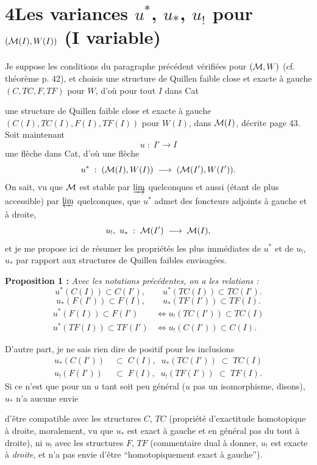\section*{4\quad Les variances $u^*$, $u_*$, $u_{!}$ pour $(\mathcal{M}(I),W(I))$ (I variable)}

Je suppose les conditions du paragraphe précédent vérifiées pour $(\mathcal{M},W)$ (cf. théorème p. 42), et choisis une structure de Quillen faible close et exacte à gauche $(C,TC,F,TF)$ pour $W$, d'où pour tout $I$ dans Cat

\noindent{}

\noindent une structure de Quillen faible close et exacte à gauche $(C(I),TC(I),F(I),TF(I))$ pour $W(I)$, dans $\mathcal{M}(I)$, décrite page 43. Soit maintenant
\[
u \;:\; I' \longrightarrow I
\]
une flèche dans Cat, d'où une flèche
\[
u^* \;:\; (\mathcal{M}(I),W(I)) \;\longrightarrow\; (\mathcal{M}(I'),W(I')).
\]
On sait, vu que $\mathcal{M}$ est stable par $\mathop{\underrightarrow{\mathrm{lim}}}$ quelconques et aussi (étant de plus accessible) par $\mathop{\underleftarrow{\mathrm{lim}}}$ quelconques, que $u^*$ admet des foncteurs adjoints à gauche et à droite,
\[
u_{!},\ u_* \;:\; \mathcal{M}(I') \;\longrightarrow\; \mathcal{M}(I),
\]
et je me propose ici de résumer les propriétés les plus immédiates de $u^*$ et de $u_{!}$, $u_*$ par rapport aux structures de Quillen faibles envisagées.

\textbf{Proposition 1 :} \textit{Avec les notations précédentes, on a les relations :}
\[
u^*(C(I)) \subset C(I'), \qquad u^*(TC(I)) \subset TC(I'). \tag*{(1)}
\]
\[
u_*(F(I')) \subset F(I), \qquad u_*(TF(I')) \subset TF(I). \tag*{(2)}
\]
\[
\begin{aligned}
u^*(F(I)) \subset F(I') &\iff u_{!}(TC(I')) \subset TC(I)\\
u^*(TF(I)) \subset TF(I') &\iff u_{!}(C(I')) \subset C(I).
\end{aligned} \tag*{(3)}
\]

D'autre part, je ne sais rien dire de positif pour les inclusions
\[
\begin{aligned}
u_*(C(I')) \;&\subset\; C(I), \;\; u_*(TC(I')) \;\subset\; TC(I)\\
u_{!}(F(I')) \;&\subset\; F(I), \;\; u_{!}(TF(I')) \;\subset\; TF(I).
\end{aligned}
\]
Si ce n'est que pour un $u$ tant soit peu général ($u$ pas un isomorphisme, disons), $u_*$ n'a aucune envie

\noindent{}

\noindent d'être compatible avec les structures $C$, $TC$ (propriété d'exactitude homotopique à droite, moralement, vu que $u_*$ est exact à gauche et en général pas du tout à droite), ni $u_{!}$ avec les structures $F$, $TF$ (commentaire dual à donner, $u_{!}$ est exacte à \textit{droite}, et n'a pas envie d'être “homotopiquement exact à gauche”). %


